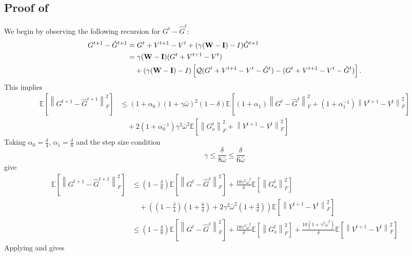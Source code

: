 \documentclass[10pt]{article} %
\theoremstyle{plain}
\theoremstyle{definition}
\theoremstyle{remark}
\newcommand{\bw}{\bar{\omega}}
\newcommand{\norm}[1]{\left\| #1 \right\|}
\newcommand{\nl}{\nonumber\\}
\newcommand{\W}{{\bf W}}
\newcommand{\I}{{\bf I}}
\begin{document}
\subsection{Proof of } \label{app:gtghat_new}
We begin by observing the following recursion for $G^{t} - \hat{G}^t$:
\begin{align*}
G^{t+1} - \hat{G}^{t+1} & = G^t + V^{t+1} - V^t + ( \gamma (\W-\I) - I ) \hat{G}^{t+1} \nl 
& = \gamma (\W-\I) ( G^t + V^{t+1} - V^t ) \nl 
& \quad + ( \gamma (\W-\I) - I ) \left[ {\cal Q}( G^t + V^{t+1} - V^t - \hat{G}^t ) - (G^t + V^{t+1} - V^t - \hat{G}^t) \right] .
\end{align*}
This implies
\begin{align*}
\mathbb{E} \left[ \norm{ G^{t+1} - \hat{G}^{t+1} }_F^2 \right] & \leq (1 + \alpha_0) (1 + \gamma \bw)^2 (1 - \delta) \mathbb{E} \left[ (1+\alpha_1) \norm{ G^t- \hat{G}^t}_F^2 + (1 + \alpha_1^{-1}) \norm{ V^{t+1} - V^t }_F^2 \right] \nl 
& \quad + 2 (1 + \alpha_0^{-1}) \gamma^2 \bw^2 \mathbb{E} \left[ \norm{G_o^t}_F^2 + \norm{ V^{t+1} - V^t }_F^2 \right] 
\end{align*}
Taking $\alpha_0 = \frac{\delta}{4}$, $\alpha_1 = \frac{\delta}{8}$ and the step size condition
\[
\gamma \leq \frac{ \delta }{ 8\bw } \leq \frac{ \delta }{ 6 \bw }
\]
give
\begin{align*}
\mathbb{E} \left[ \norm{ G^{t+1} - \hat{G}^{t+1} }_F^2 \right] & \leq \left(1 - \frac{\delta}{8} \right) \mathbb{E} \left[ \norm{ G^{t} - \hat{G}^{t} }_F^2 \right] + \frac{10 \gamma^2 \bw^2}{\delta} \mathbb{E} \left[ \norm{G_o^t}_F^2 \right] \nl
& \quad + \left( (1 - \frac{\delta}{4})(1 + \frac{8}{\delta}) + 2 \gamma^2 \bw^2 (1 + \frac{4}{\delta} ) \right) \mathbb{E} \left[ \norm{ V^{t+1} - V^t }_F^2 \right] \nl 
& \leq \left(1 - \frac{\delta}{8} \right) \mathbb{E} \left[ \norm{ G^{t} - \hat{G}^{t} }_F^2 \right] + \frac{10 \gamma^2 \bw^2}{\delta} \mathbb{E} \left[ \norm{G_o^t}_F^2 \right] + \frac{10(1+\gamma^2\bw^2)}{\delta} \mathbb{E} \left[ \norm{ V^{t+1} - V^t }_F^2 \right] 
\end{align*}
Applying  and  gives
\end{document}
